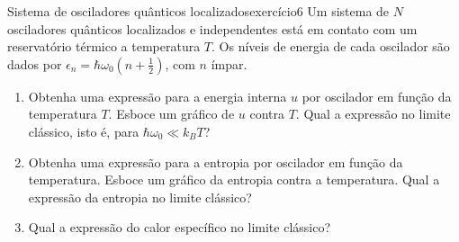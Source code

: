 \begin{exercício}{Sistema de osciladores quânticos localizados}{exercício6}
    Um sistema de \(N\) osciladores quânticos localizados e independentes está em contato com um reservatório térmico a temperatura \(T\). Os níveis de energia de cada oscilador são dados por \(\epsilon_n = \hbar \omega_0 (n + \frac12)\), com \(n\) ímpar.
    \begin{enumerate}[label=(\alph*)]
        \item Obtenha uma expressão para a energia interna \(u\) por oscilador em função da temperatura \(T\). Esboce um gráfico de \(u\) contra \(T\). Qual a expressão no limite clássico, isto é, para \(\hbar \omega_0 \ll k_B T\)?
        \item Obtenha uma expressão para a entropia por oscilador em função da temperatura. Esboce um gráfico da entropia contra a temperatura. Qual a expressão da entropia no limite clássico?
        \item  Qual a expressão do calor específico no limite clássico?
    \end{enumerate}
\end{exercício}
